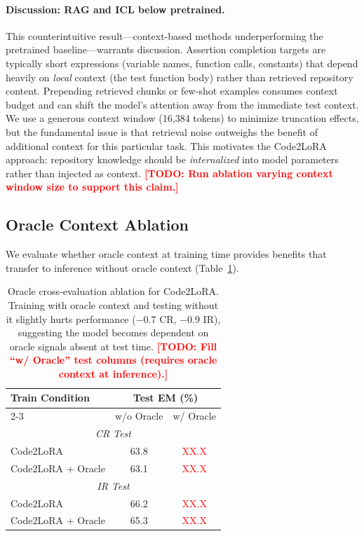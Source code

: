 \documentclass[11pt]{article}
\newcommand{\method}{Code2LoRA}
\newcommand{\todo}[1]{\textcolor{red}{\textbf{[TODO: #1]}}}
\newcommand{\todoinline}[1]{\textcolor{red}{#1}}
\begin{document}
\paragraph{Discussion: RAG and ICL below pretrained.}
This counterintuitive result---context-based methods underperforming the pretrained baseline---warrants discussion.
Assertion completion targets are typically short expressions (variable names, function calls, constants) that depend heavily on \emph{local} context (the test function body) rather than retrieved repository content.
Prepending retrieved chunks or few-shot examples consumes context budget and can shift the model's attention away from the immediate test context.
We use a generous context window (16,384 tokens) to minimize truncation effects, but the fundamental issue is that retrieval noise outweighs the benefit of additional context for this particular task.
This motivates the \method{} approach: repository knowledge should be \emph{internalized} into model parameters rather than injected as context.
\todo{Run ablation varying context window size to support this claim.}

\subsection{Oracle Context Ablation}
\label{sec:oracle_ablation}

We evaluate whether oracle context at training time provides benefits that transfer to inference without oracle context (Table~\ref{tab:oracle_ablation}).

\begin{table}[t]
\centering
\small
\begin{tabular}{lcc}
\toprule
\multirow{2}{*}{Train Condition} & \multicolumn{2}{c}{Test EM (\%)} \\
\cmidrule(lr){2-3}
& w/o Oracle & w/ Oracle \\
\midrule
\multicolumn{3}{c}{\emph{CR Test}} \\
\midrule
\method{} & 63.8 & \todoinline{XX.X} \\
\method{} + Oracle & 63.1 & \todoinline{XX.X} \\
\midrule
\multicolumn{3}{c}{\emph{IR Test}} \\
\midrule
\method{} & 66.2 & \todoinline{XX.X} \\
\method{} + Oracle & 65.3 & \todoinline{XX.X} \\
\bottomrule
\end{tabular}
\caption{Oracle cross-evaluation ablation for \method{}. Training with oracle context and testing without it slightly hurts performance ($-$0.7 CR, $-$0.9 IR), suggesting the model becomes dependent on oracle signals absent at test time. \todo{Fill ``w/ Oracle'' test columns (requires oracle context at inference).}}
\label{tab:oracle_ablation}
\end{table}
\end{document}
